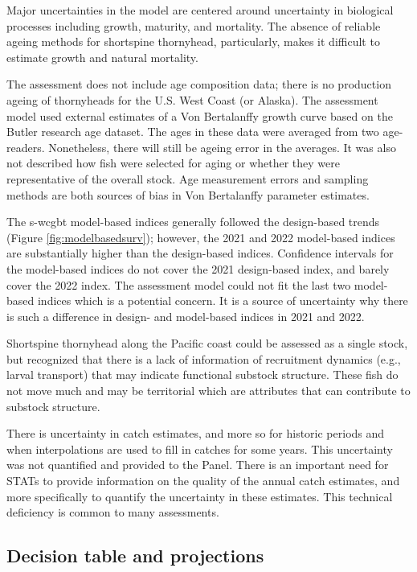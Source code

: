 \documentclass[11pt,
  english,
  letterpaper,
]{article}
\begin{document}
Major uncertainties in the model are centered around uncertainty in biological processes including growth, maturity, and mortality. The absence of reliable ageing methods for shortspine thornyhead, particularly, makes it difficult to estimate growth and natural mortality.

The assessment does not include age composition data; there is no production ageing of thornyheads for the U.S. West Coast (or Alaska). The assessment model used external estimates of a Von Bertalanffy growth curve based on the Butler research age dataset. The ages in these data were averaged from two age-readers. Nonetheless, there will still be ageing error in the averages. It was also not described how fish were selected for aging or whether they were representative of the overall stock. Age measurement errors and sampling methods are both sources of bias in Von Bertalanffy parameter estimates.

The \gls{s-wcgbt} model-based indices generally followed the design-based trends (Figure \ref{fig:modelbasedsurv}); however, the 2021 and 2022 model-based indices are substantially higher than the design-based indices. Confidence intervals for the model-based indices do not cover the 2021 design-based index, and barely cover the 2022 index. The assessment model could not fit the last two model-based indices which is a potential concern. It is a source of uncertainty why there is such a difference in design- and model-based indices in 2021 and 2022.

Shortspine thornyhead along the Pacific coast could be assessed as a single stock, but recognized that there is a lack of information of recruitment dynamics (e.g., larval transport) that may indicate functional substock structure. These fish do not move much and may be territorial which are attributes that can contribute to substock structure.

There is uncertainty in catch estimates, and more so for historic periods and when interpolations are used to fill in catches for some years. This uncertainty was not quantified and provided to the Panel. There is an important need for STATs to provide information on the quality of the annual catch estimates, and more specifically to quantify the uncertainty in these estimates. This technical deficiency is common to many assessments.

\hypertarget{decision-table-and-projections}{%
\subsection*{Decision table and projections}\label{decision-table-and-projections}}
\end{document}
